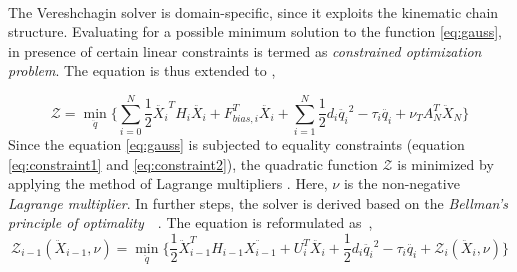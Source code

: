 % 


\paragraph{}The Vereshchagin solver is domain-specific, since it exploits the kinematic chain structure. Evaluating for a possible minimum solution to the function \ref{eq:gauss}, in presence of certain linear constraints is termed as \textit{constrained optimization problem}. The equation is thus extended to \cite{shakhimardanov2015composable}, 

 \begin{equation} \label{eq:minimization}
 \mathcal{Z} = \min_{\ddot{q}} \Big \{\sum_{i=0}^{N} \frac{1}{2} \ddot{X_i}^T H_i \ddot{X_i} + F_{bias, i}^T\ddot{X_i} + \sum_{i=1}^{N} \frac{1}{2} d_i \ddot{q_i}^2 - \tau_i \ddot{q_i} + \nu_T A^T_N \ddot{X}_N \Big \}
 \end{equation} 
Since the equation \ref{eq:gauss} is subjected to equality constraints (equation \ref{eq:constraint1} and \ref{eq:constraint2}), the quadratic function $\mathcal{Z}$ is minimized by applying the method of Lagrange multipliers \cite{bertsekas2014constrained}. Here, $\nu$ is the non-negative \textit{Lagrange multiplier}. In further steps, the solver is derived based on the \textit{Bellman's principle of optimality}~\cite{bertsekas1996dynamic}~\cite{bellman2013dynamic}. The equation is reformulated  as~\cite{shakhimardanov2015composable},
 \begin{equation} \label{eq:bellman}
 \mathcal{Z}_{i-1}(\ddot{X}_{i-1}, \nu) = \min_{\ddot{q}} \Big \{ \frac{1}{2} \ddot{X}_{i-1}^T H_{i-1} \ddot{X_{i-1}} + U_i^T\ddot{X_i} + \frac{1}{2} d_i \ddot{q_i}^2 - \tau_i \ddot{q_i} + \mathcal{Z}_i(\ddot{X}_i, \nu)\Big \}
 \end{equation} 
 
